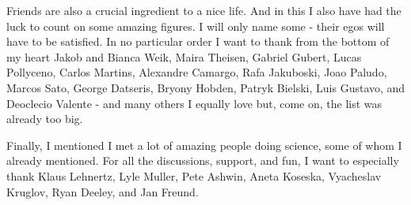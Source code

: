 Friends are also a crucial ingredient to a nice life. And in this I also have had the luck to count on some amazing figures. I will only name some - their egos will have to be satisfied. In no particular order I want to thank from the bottom of my heart Jakob and Bianca Weik, Maira Theisen, Gabriel Gubert, Lucas Pollyceno, Carlos Martins, Alexandre Camargo, Rafa Jakuboski, Joao Paludo, Marcos Sato, George Datseris, Bryony Hobden, Patryk Bielski, Luis Gustavo, and Deoclecio Valente - and many others I equally love but, come on, the list was already too big. 

Finally, I mentioned I met a lot of amazing people doing science, some of whom I already mentioned. For all the discussions, support, and fun, I want to especially thank Klaus Lehnertz, Lyle Muller, Pete Ashwin, Aneta Koseska, Vyacheslav Kruglov, Ryan Deeley, and Jan Freund.
